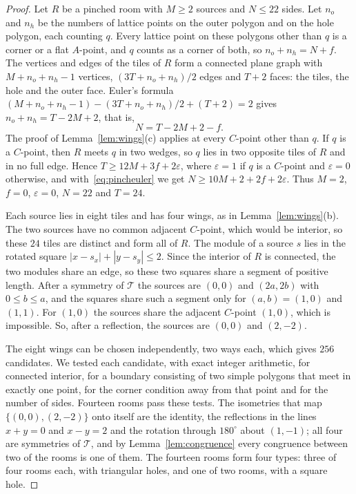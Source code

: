 \documentclass[11pt,a4paper]{article}
\theoremstyle{plain}
\theoremstyle{definition}
\theoremstyle{remark}
\newcommand{\T}{\mathcal{T}}
\newcommand{\dg}{^\circ}
\numberwithin{equation}{section}
\begin{document}
\begin{proof}
Let $R$ be a pinched room with $M\ge2$ sources and $N\le22$ sides. Let $n_o$ and $n_h$ be the numbers of lattice points on the outer polygon and on the hole polygon, each counting $q$. Every lattice point on these polygons other than $q$ is a corner or a flat $A$-point, and $q$ counts as a corner of both, so $n_o+n_h=N+f$. The vertices and edges of the tiles of $R$ form a connected plane graph with $M+n_o+n_h-1$ vertices, $(3T+n_o+n_h)/2$ edges and $T+2$ faces: the tiles, the hole and the outer face. Euler's formula $(M+n_o+n_h-1)-(3T+n_o+n_h)/2+(T+2)=2$ gives $n_o+n_h=T-2M+2$, that is,
\begin{equation}\label{eq:pincheuler}
N=T-2M+2-f.
\end{equation}
The proof of Lemma~\ref{lem:wings}(c) applies at every $C$-point other than $q$. If $q$ is a $C$-point, then $R$ meets $q$ in two wedges, so $q$ lies in two opposite tiles of $R$ and in no full edge. Hence $T\ge12M+3f+2\varepsilon$, where $\varepsilon=1$ if $q$ is a $C$-point and $\varepsilon=0$ otherwise, and with~\eqref{eq:pincheuler} we get $N\ge10M+2+2f+2\varepsilon$. Thus $M=2$, $f=0$, $\varepsilon=0$, $N=22$ and $T=24$.

Each source lies in eight tiles and has four wings, as in Lemma~\ref{lem:wings}(b). The two sources have no common adjacent $C$-point, which would be interior, so these $24$ tiles are distinct and form all of $R$. The module of a source $s$ lies in the rotated square $|x-s_x|+|y-s_y|\le2$. Since the interior of $R$ is connected, the two modules share an edge, so these two squares share a segment of positive length. After a symmetry of $\T$ the sources are $(0,0)$ and $(2a,2b)$ with $0\le b\le a$, and the squares share such a segment only for $(a,b)=(1,0)$ and $(1,1)$. For $(1,0)$ the sources share the adjacent $C$-point $(1,0)$, which is impossible. So, after a reflection, the sources are $(0,0)$ and $(2,-2)$.

The eight wings can be chosen independently, two ways each, which gives $256$ candidates. We tested each candidate, with exact integer arithmetic, for connected interior, for a boundary consisting of two simple polygons that meet in exactly one point, for the corner condition away from that point and for the number of sides. Fourteen rooms pass these tests. The isometries that map $\{(0,0),(2,-2)\}$ onto itself are the identity, the reflections in the lines $x+y=0$ and $x-y=2$ and the rotation through $180\dg$ about $(1,-1)$; all four are symmetries of $\T$, and by Lemma~\ref{lem:congruence} every congruence between two of the rooms is one of them. The fourteen rooms form four types: three of four rooms each, with triangular holes, and one of two rooms, with a square hole.
\end{proof}
\end{document}
